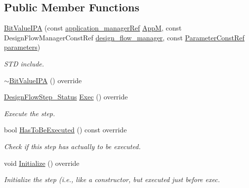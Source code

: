 \subsection*{Public Member Functions}
\begin{DoxyCompactItemize}
\item 
\hyperlink{classBitValueIPA_aa139744d704f77b52956f5ee3a9fd80c}{Bit\+Value\+I\+PA} (const \hyperlink{application__manager_8hpp_a04ccad4e5ee401e8934306672082c180}{application\+\_\+manager\+Ref} \hyperlink{classFrontendFlowStep_a0ac0d8db2a378416583f51c4faa59d15}{AppM}, const Design\+Flow\+Manager\+Const\+Ref \hyperlink{classDesignFlowStep_ab770677ddf087613add30024e16a5554}{design\+\_\+flow\+\_\+manager}, const \hyperlink{Parameter_8hpp_a37841774a6fcb479b597fdf8955eb4ea}{Parameter\+Const\+Ref} \hyperlink{classDesignFlowStep_a802eaafe8013df706370679d1a436949}{parameters})
\begin{DoxyCompactList}\small\item\em S\+TD include. \end{DoxyCompactList}\item 
\hyperlink{classBitValueIPA_a58528bc1a3e758b534fc3180dfcc2cf3}{$\sim$\+Bit\+Value\+I\+PA} () override
\item 
\hyperlink{design__flow__step_8hpp_afb1f0d73069c26076b8d31dbc8ebecdf}{Design\+Flow\+Step\+\_\+\+Status} \hyperlink{classBitValueIPA_a83d4228b39c126b0007701f32409a71c}{Exec} () override
\begin{DoxyCompactList}\small\item\em Execute the step. \end{DoxyCompactList}\item 
bool \hyperlink{classBitValueIPA_aaf4e7bb4cee74b03ae5e8fd94e593f2d}{Has\+To\+Be\+Executed} () const override
\begin{DoxyCompactList}\small\item\em Check if this step has actually to be executed. \end{DoxyCompactList}\item 
void \hyperlink{classBitValueIPA_a00d93654fdcf33acbd281faa1915dbbd}{Initialize} () override
\begin{DoxyCompactList}\small\item\em Initialize the step (i.\+e., like a constructor, but executed just before exec. \end{DoxyCompactList}\end{DoxyCompactItemize}

